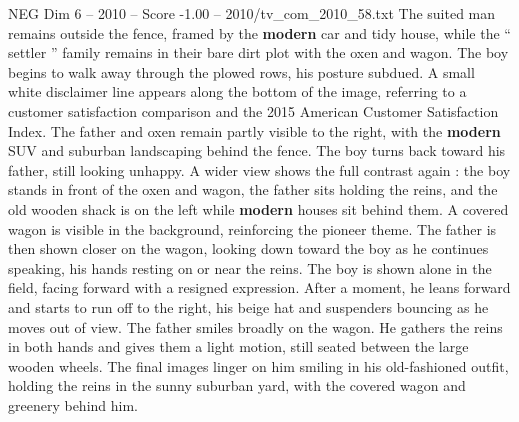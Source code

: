 \begin{textsample}{NEG Dim 6 – 2010 – Score -1.00 – 2010/tv\_com\_2010\_58.txt}
The suited man remains outside the fence, framed by the \textbf{modern} car and tidy house, while the “ settler ” family remains in their bare dirt plot with the oxen and wagon.
The boy begins to walk away through the plowed rows, his posture subdued.
A small white disclaimer line appears along the bottom of the image, referring to a customer satisfaction comparison and the 2015 American Customer Satisfaction Index.
The father and oxen remain partly visible to the right, with the \textbf{modern} SUV and suburban landscaping behind the fence.
The boy turns back toward his father, still looking unhappy.
A wider view shows the full contrast again : the boy stands in front of the oxen and wagon, the father sits holding the reins, and the old wooden shack is on the left while \textbf{modern} houses sit behind them.
A covered wagon is visible in the background, reinforcing the pioneer theme.
The father is then shown closer on the wagon, looking down toward the boy as he continues speaking, his hands resting on or near the reins.
The boy is shown alone in the field, facing forward with a resigned expression.
After a moment, he leans forward and starts to run off to the right, his beige hat and suspenders bouncing as he moves out of view.
The father smiles broadly on the wagon.
He gathers the reins in both hands and gives them a light motion, still seated between the large wooden wheels.
The final images linger on him smiling in his old-fashioned outfit, holding the reins in the sunny suburban yard, with the covered wagon and greenery behind him.

\end{textsample}
